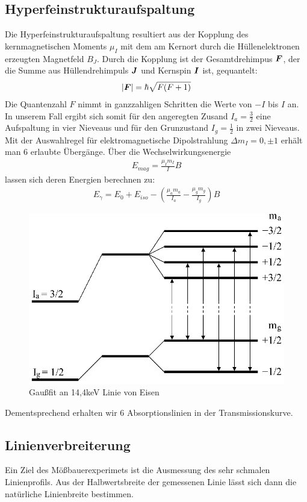 \documentclass[12pt]{article}
\renewcommand*\vec[1]{{\mbox{\boldmath\ensuremath{#1}}}}
\begin{document}
\subsection{Hyperfeinstrukturaufspaltung}
Die Hyperfeinstrukturaufspaltung resultiert aus der Kopplung des kernmagnetischen Moments $\mu_I$ mit dem am Kernort durch die Hüllenelektronen erzeugten Magnetfeld $B_J$.
Durch die Kopplung ist der Gesamtdrehimpus $\vec{F}$, der die Summe aus Hüllendrehimpuls $\vec{J}$ und Kernspin $\vec{I}$ ist, gequantelt:
\begin{align}
 \left|\vec{F}\right| = \hbar \sqrt{F(F+1)}
\end{align}
Die Quantenzahl $F$ nimmt in ganzzahligen Schritten die Werte von $-I$ bis $I$ an.
In unserem Fall ergibt sich somit für den angeregten Zusand $I_a = \frac{3}{2}$ eine Aufspaltung in vier Nieveaus und für den Grunzustand $I_g = \frac{1}{2}$ in zwei Nieveaus.
Mit der Auswahlregel für elektromagnetische Dipolstrahlung $\Delta m_I = 0, \pm 1$ erhält man $6$ erlaubte Übergänge. Über die Wechselwirkungsenergie
\begin{align}
 E_{mag} = \frac{\mu_I m_I}{I} B
\end{align}
lassen sich deren Energien berechnen zu:
\begin{align}
 E_\gamma = E_0 + E_{iso} - \left(\frac{\mu_a m_a}{I_a} - \frac{\mu_g m_g}{I_g} \right) B
\label{hfs}
\end{align}
\begin{figure}[H]
 \includegraphics[width=0.9\linewidth]{pictures/termshema_eisen.eps}
 \caption{Gaußfit an 14,4keV Linie von Eisen}
\label{eisen_term}
\end{figure}
Dementsprechend erhalten wir 6 Absorptionslinien in der Transmissionskurve.
\subsection{Linienverbreiterung}
\label{linienverbreiterung}
Ein Ziel des Mößbauerexperimets ist die Ausmessung des sehr schmalen Linienprofils. Aus der Halbwertsbreite der gemessenen Linie lässt sich dann die natürliche Linienbreite bestimmen.
\end{document}
